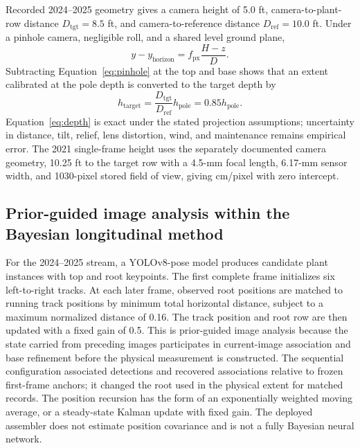 \documentclass[12pt,letterpaper]{article}
\begin{document}
Recorded 2024--2025 geometry gives a camera height of 5.0 ft, camera-to-plant-row distance $D_{\mathrm{tgt}}=8.5$ ft, and camera-to-reference distance $D_{\mathrm{ref}}=10.0$ ft. Under a pinhole camera, negligible roll, and a shared level ground plane,
\begin{equation}
y-y_{\mathrm{horizon}}=f_{\mathrm{px}}\frac{H-z}{D}.
\label{eq:pinhole}
\end{equation}
Subtracting Equation~\ref{eq:pinhole} at the top and base shows that an extent calibrated at the pole depth is converted to the target depth by
\begin{equation}
h_{\mathrm{target}}=\frac{D_{\mathrm{tgt}}}{D_{\mathrm{ref}}}h_{\mathrm{pole}}=0.85h_{\mathrm{pole}}.
\label{eq:depth}
\end{equation}
Equation~\ref{eq:depth} is exact under the stated projection assumptions; uncertainty in distance, tilt, relief, lens distortion, wind, and maintenance remains empirical error. The 2021 single-frame height uses the separately documented camera geometry, 10.25 ft to the target row with a 4.5-mm focal length, 6.17-mm sensor width, and 1030-pixel stored field of view, giving \PixelCmPerPx{} cm/pixel with zero intercept.

\subsection{Prior-guided image analysis within the Bayesian longitudinal method}

For the 2024--2025 stream, a YOLOv8-pose model produces candidate plant instances with top and root keypoints. The first complete frame initializes six left-to-right tracks. At each later frame, observed root positions are matched to running track positions by minimum total horizontal distance, subject to a maximum normalized distance of 0.16. The track position and root row are then updated with a fixed gain of 0.5. This is prior-guided image analysis because the state carried from preceding images participates in current-image association and base refinement before the physical measurement is constructed. The sequential configuration associated \SequentialMatches{} detections and recovered \SequentialExtraMatches{} associations relative to frozen first-frame anchors; it changed the root used in the physical extent for \PosteriorRootChanged{} matched records. The position recursion has the form of an exponentially weighted moving average, or a steady-state Kalman update with fixed gain. The deployed assembler does not estimate position covariance and is not a fully Bayesian neural network.
\end{document}
